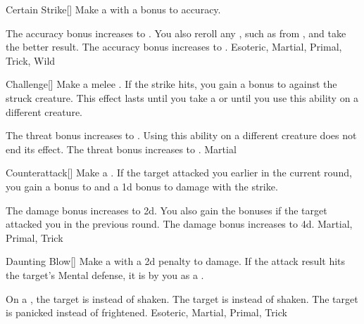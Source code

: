\lowercase{\hypertarget{maneuver:Certain Strike}{}}\label{maneuver:Certain Strike}
\hypertarget{maneuver:Certain Strike}{}
\begin{freeability}{Certain Strike}[]
Make a  with a  bonus to accuracy.

\rankline
{} The accuracy bonus increases to .
 You also reroll any , such as from , and take the better result.
 The accuracy bonus increases to .
 Esoteric, Martial, Primal, Trick, Wild
\end{freeability}
\vspace{0.25em}



\lowercase{\hypertarget{maneuver:Challenge}{}}\label{maneuver:Challenge}
\hypertarget{maneuver:Challenge}{}
\begin{freeability}{Challenge}[]
Make a melee .
If the strike hits, you gain a  bonus to  against the struck creature.
This effect lasts until you take a  or until you use this ability on a different creature.

\rankline
{} The threat bonus increases to .
 Using this ability on a different creature does not end its effect.
 The threat bonus increases to .
 Martial
\end{freeability}
\vspace{0.25em}



\lowercase{\hypertarget{maneuver:Counterattack}{}}\label{maneuver:Counterattack}
\hypertarget{maneuver:Counterattack}{}
\begin{freeability}{Counterattack}[]
Make a .
If the target attacked you earlier in the current round, you gain a  bonus to  and a \plus1d bonus to damage with the strike.

\rankline
{} The damage bonus increases to \plus2d.
 You also gain the bonuses if the target attacked you in the previous round.
 The damage bonus increases to \plus4d.
 Martial, Primal, Trick
\end{freeability}
\vspace{0.25em}



\lowercase{\hypertarget{maneuver:Daunting Blow}{}}\label{maneuver:Daunting Blow}
\hypertarget{maneuver:Daunting Blow}{}
\begin{freeability}{Daunting Blow}[]
Make a  with a \minus2d penalty to damage.
If the attack result hits the target's Mental defense,
it is  by you as a .

\rankline
{} On a , the target is  instead of shaken.
 The target is  instead of shaken.
 The target is panicked instead of frightened.
 Esoteric, Martial, Primal, Trick
\end{freeability}
\vspace{0.25em}



